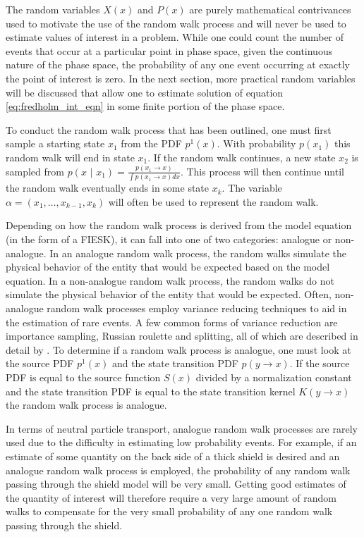 The random variables $X(x)$ and $P(x)$ are purely mathematical contrivances
used to motivate the use of the random walk process and will never be used 
to estimate values of interest in a problem. While one could count the
number of events that occur at a particular point in phase space, given the 
continuous nature of the phase space, the probability of any one event 
occurring at exactly the point of interest is zero. In the next section, more 
practical random variables will be discussed that allow one to estimate 
solution of equation \ref{eq:fredholm_int_eqn} in some finite portion of the 
phase space.

To conduct the random walk process that has been outlined, one must first 
sample a starting state $x_1$ from the PDF $p^1(x)$. With probability $p(x_1)$ 
this random walk will end in state $x_1$. If the random walk continues, a new 
state $x_2$ is sampled from 
$p(x \text{ | } x_1) = \frac{p(x_1 \to x)}{\int p(x_1 \to x)dx}$. This process will then continue 
until the random walk eventually ends in some state $x_k$. The variable 
$\alpha = (x_1,\ldots,x_{k-1},x_k)$ will often be used to represent the random 
walk. 

Depending on how the random walk process is derived from the model equation (in
the form of a FIESK), it can fall into one of two categories: analogue or 
non-analogue. In an analogue random walk process, the random walks simulate 
the physical behavior of the entity that would be expected based on the model 
equation. In a non-analogue random walk process, the random walks do not 
simulate the physical behavior of the entity that would be expected. Often, 
non-analogue random walk processes employ variance reducing techniques to aid 
in the estimation of rare events. A few common forms of variance reduction are
importance sampling, Russian roulette and splitting, all of which are described
in detail by \citet{spanier_monte_1969}. To determine if a random walk
process is analogue, one must look at the source PDF $p^1(x)$ and the state 
transition PDF $p(y \to x)$. If the source PDF is equal to the source function
$S(x)$ divided by a normalization constant and the state transition PDF is 
equal to the state transition kernel $K(y \to x)$ the random walk process is 
analogue. 

In terms of neutral particle transport, analogue random walk processes are 
rarely used due to the difficulty in estimating low probability events. For
example, if an estimate of some quantity on the back side of a thick shield is 
desired and an analogue random walk process is employed, the probability of any 
random walk passing through the shield model will be very small. Getting good
estimates of the quantity of interest will therefore require a very large
amount of random walks to compensate for the very small probability of any one
random walk passing through the shield. 


